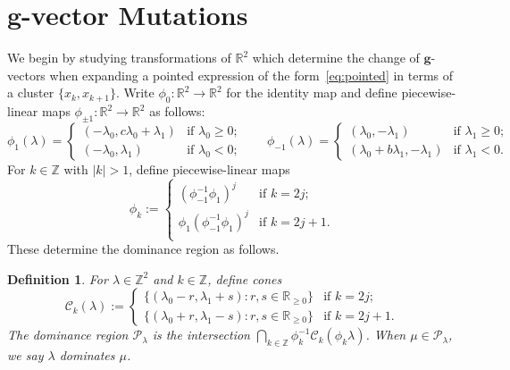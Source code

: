 \documentclass{amsart}
\newtheorem{definition}[theorem]{Definition}
\numberwithin{theorem}{section}
\newcommand{\bfg}{\boldsymbol{g}}
\newcommand{\cC}{\mathcal{C}}
\newcommand{\cP}{\mathcal{P}}
\newcommand{\RR}{\mathbb{R}}
\newcommand{\ZZ}{\mathbb{Z}}
\begin{document}
\section{$\bfg$-vector Mutations}
\label{sec:tropical}

  We begin by studying transformations of $\RR^2$ which determine the change of $\bfg$-vectors when expanding a pointed expression of the form~\eqref{eq:pointed} in terms of a cluster $\{x_k,x_{k+1}\}$.
  Write $\phi_0:\RR^2\to\RR^2$ for the identity map and define piecewise-linear maps $\phi_{\pm 1}:\RR^2\to\RR^2$ as follows:
  \begin{equation}
    \phi_1(\lambda)
    =
    \begin{cases} 
      (-\lambda_0,c\lambda_0+\lambda_1) & \text{if $\lambda_0 \ge 0$;}\\
      (-\lambda_0,\lambda_1) & \text{if $\lambda_0 < 0$;}
    \end{cases}
    \qquad
    \phi_{-1}(\lambda)
    =
    \begin{cases} 
      (\lambda_0,-\lambda_1) & \text{if $\lambda_1 \ge 0$;}\\
      (\lambda_0+b\lambda_1,-\lambda_1) & \text{if $\lambda_1 < 0$.}
    \end{cases}
  \end{equation}
  For $k\in\ZZ$ with $|k|>1$, define piecewise-linear maps
  \[\phi_k
    :=
    \begin{cases}
      (\phi_{-1}^{-1}\phi_1)^j & \text{if $k=2j$;}\\
      \phi_1(\phi_{-1}^{-1}\phi_1)^j & \text{if $k=2j+1$.}\\
    \end{cases}
  \]
  These determine the dominance region as follows.
  \begin{definition}
    \label{def:dominance}
    For $\lambda\in\ZZ^2$ and $k\in\ZZ$, define cones 
    \[\cC_k(\lambda)
      :=
      \begin{cases}
        \{(\lambda_0-r,\lambda_1+s):r,s\in\RR_{\ge0}\} & \text{if $k=2j$;}\\
        \{(\lambda_0+r,\lambda_1-s):r,s\in\RR_{\ge0}\} & \text{if $k=2j+1$.}
      \end{cases}
    \]
    The \emph{dominance region} $\cP_\lambda$ is the intersection  $\bigcap_{k\in\ZZ}\phi_k^{-1}\cC_k(\phi_k\lambda)$.
    When $\mu\in\cP_\lambda$, we say \emph{$\lambda$ dominates $\mu$}.
  \end{definition}
\end{document}
